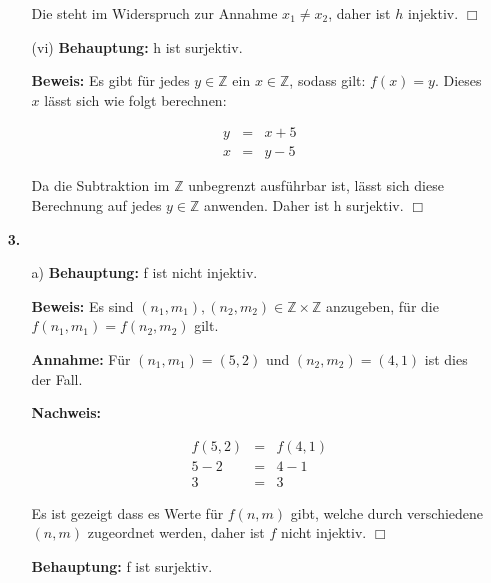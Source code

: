 \documentclass[a4paper]{scrartcl}
\begin{document}
\begin{enumerate}
\begin{enumerate}
                Die steht im Widerspruch zur Annahme $x_1 \not= x_2$, daher ist $h$ injektiv. $\Box$
                
            \item[(vi)]
                \textbf{Behauptung:} h ist surjektiv.

                \textbf{Beweis:} Es gibt für jedes $y \in \mathbb{Z}$ ein $x \in \mathbb{Z}$, sodass gilt: $f(x) = y$. Dieses
                $x$ lässt sich wie folgt berechnen:
                
                $$\begin{array}{rcl}
                    y &=& x + 5\\
                    x &=& y - 5 
                \end{array}$$
                
                Da die Subtraktion im $\mathbb{Z}$ unbegrenzt ausführbar ist, lässt sich diese Berechnung auf jedes $y \in \mathbb{Z}$
                anwenden. Daher ist h surjektiv. $\Box$
        \end{enumerate}
    
    \newpage
    \item[\textbf{3.}]
        \begin{enumerate}
            \item[a)]
                \textbf{Behauptung:} f ist nicht injektiv.

                \textbf{Beweis:} Es sind $(n_1, m_1), (n_2, m_2) \in \mathbb{Z} \times \mathbb{Z}$ anzugeben, für die $f(n_1, m_1) = f(n_2, m_2)$ gilt.

                \textbf{Annahme:} Für $(n_1, m_1) = (5, 2)$ und $(n_2, m_2) = (4, 1)$ ist dies der Fall.

                \textbf{Nachweis:}

                $$\begin{array}{rcl}
                    f(5, 2) &=& f(4, 1)\\
                    5 - 2 &=& 4 - 1\\
                    3 &=& 3
                \end{array}$$

                Es ist gezeigt dass es Werte für $f(n, m)$ gibt, welche durch verschiedene $(n, m)$ zugeordnet werden, daher
                ist $f$ nicht injektiv. $\Box$
                
                \textbf{Behauptung:} f ist surjektiv.


\end{enumerate}
\end{enumerate}
\end{document}
